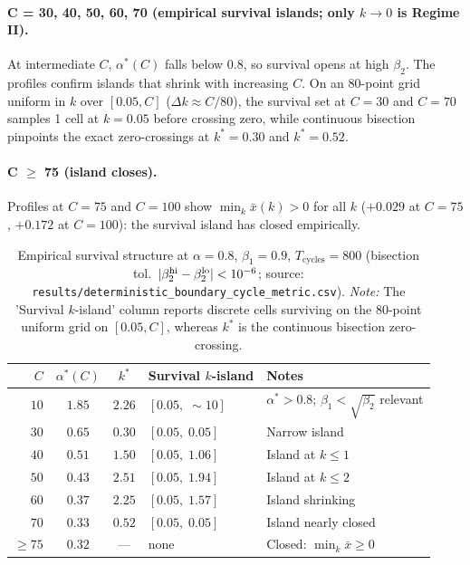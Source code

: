 \paragraph{C = 30, 40, 50, 60, 70 (empirical survival islands; only $k \to 0$ is Regime II).}
At intermediate $C$, $\alpha^*(C)$ falls below $0.8$, so survival opens at high $\beta_2$. The profiles confirm islands that shrink with increasing $C$. On an 80-point grid uniform in $k$ over $[0.05, C]$ ($\Delta k \approx C/80$), the survival set at $C=30$ and $C=70$ samples 1 cell at $k=0.05$ before crossing zero, while continuous bisection pinpoints the exact zero-crossings at $k^*=0.30$ and $k^*=0.52$.

\paragraph{C $\ge$ 75 (island closes).}
Profiles at $C=75$ and $C=100$ show $\min_k\bar{x}(k) > 0$ for all $k$ ($+0.029$ at $C=75$, $+0.172$ at $C=100$): the survival island has closed empirically.

\begin{table}[ht]
\centering
\scriptsize
\setlength{\tabcolsep}{2.5pt}
\caption{Empirical survival structure at $\alpha=0.8$, $\beta_1=0.9$, $T_{\text{cycles}}=800$ (bisection tol.\ $|\beta_2^{\rm hi}-\beta_2^{\rm lo}|<10^{-6}$; source: \nolinkurl{results/deterministic_boundary_cycle_metric.csv}). \emph{Note:} The 'Survival $k$-island' column reports discrete cells surviving on the 80-point uniform grid on $[0.05, C]$, whereas $k^*$ is the continuous bisection zero-crossing.}
\label{tab:det_cycle_boundary}
\begin{tabular}{@{}r c c l p{2.4cm}@{}}
\toprule
$C$ & $\alpha^*(C)$ & $k^*$ & Survival $k$-island & Notes \\
\midrule
$10$  & $1.85$ & $2.26$ & $[0.05,\;\sim\!10]$ & $\alpha^*>0.8$; $\beta_1{<}\sqrt{\beta_2}$ relevant \\
$30$  & $0.65$ & $0.30$ & $[0.05,\; 0.05]$ & Narrow island \\
$40$  & $0.51$ & $1.50$ & $[0.05,\; 1.06]$ & Island at $k\le 1$ \\
$50$  & $0.43$ & $2.51$ & $[0.05,\; 1.94]$ & Island at $k\le 2$ \\
$60$  & $0.37$ & $2.25$ & $[0.05,\; 1.57]$ & Island shrinking \\
$70$  & $0.33$ & $0.52$ & $[0.05,\; 0.05]$ & Island nearly closed \\
$\ge 75$ & $0.32$ & --- & none & Closed: $\min_k\bar{x}\ge 0$ \\
\bottomrule
\end{tabular}
\end{table}

